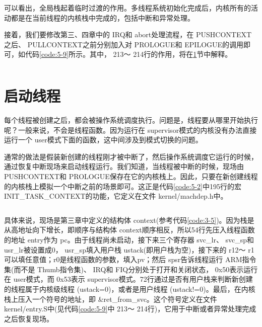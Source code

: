 \documentclass[main.tex]{subfiles}
\begin{document}
\begin{CJK*}{UTF8}{song}
\begin{code}
\label{code:5-8}
\inputminted[firstline=99,lastline=122,linenos,numbersep=5pt,frame=lines,framesep=2mm]{gas}{src/chapter05/kernel/entry.S}
\end{code}

\par
可以看出，全局栈起着临时过渡的作用。多线程系统初始化完成后，内核所有的活动都是在当前线程的内核栈中完成的，包括中断和异常处理。

\par
接着，我们要修改第三、四章中的 IRQ和 abort处理流程，在 PUSH\-CONTEXT之后、  PULL\-CONTEXT之前分别加入对 PROLOGUE和 EPILOGUE的调用即可，如代码\ref{code:5-9}所示。其中， 213～ 214行的作用，将在\ref{section:start-thread}节中解释。

\begin{code}
\label{code:5-9}
\inputminted[firstline=201,lastline=243,linenos,numbersep=5pt,frame=lines,framesep=2mm]{gas}{src/chapter05/kernel/entry.S}
\end{code}

\section{启动线程}
\label{section:start-thread}
每个线程被创建之后，都会被操作系统调度执行。问题是，线程要从哪里开始执行呢？一般来说，不会是线程函数。因为运行在 supervisor模式的内核没有办法直接运行一个 user模式下面的函数，这中间涉及到模式切换的问题。

\par
通常的做法是假装新创建的线程刚才被中断了，然后操作系统调度它运行的时候，通过恢复中断现场来启动线程运行。我们知道，当线程被中断的时候，现场由 PUSH\-CONTEXT和 PROLOGUE保存在它的内核栈上。因此，只要在新创建线程的内核栈上模拟一个中断之前的场景即可。这正是代码\ref{code:5-2}中195行的宏 INIT\_\-TASK\_\-CONTEXT的功能，它定义在文件 kernel\-/\-machdep.h中。

\begin{code}
\label{code:5-10}
\inputminted[firstline=47,lastline=73,linenos,numbersep=5pt,frame=lines,framesep=2mm]{c}{src/chapter05/kernel/machdep.h}
\end{code}

具体来说，现场是第三章中定义的结构体 context(参考代码\ref{code:3-5})。因为栈是从高地址向下增长，即顺序与结构体 context顺序相反，所以54行先压入线程函数的地址 entry作为 pc。由于线程尚未启动，接下来三个寄存器 svc\_\-lr、 svc\_\-sp和 usr\_\-lr被设置成0， usr\_\-sp填入用户栈 ustack(即用户栈为空)，接下来的 r12～ r1可以填任意值；r0是线程函数的参数，填入pv；然后 spsr告诉线程运行 ARM指令集(而不是 Thumb指令集)、 IRQ和 FIQ分别处于打开和关闭状态， 0x50表示运行在 user模式，而 0x53表示  supervisor模式。72行通过是否有用户栈来判断新创建的线程属于内核级线程 (ustack=0)，或者是用户线程 (ustack!=0)。最后，在内核栈上压入一个符号的地址，即  \&ret\_\-from\_\-svc。这个符号定义在文件  kernel\-/\-entry.S中(见代码\ref{code:5-9}中 213～ 214行)，它用于中断或者异常处理完成之后恢复现场。


\end{CJK*}
\end{document}
